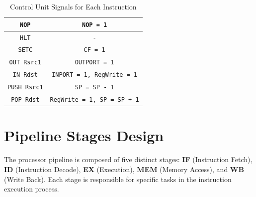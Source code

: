 \documentclass{report}
\begin{document}
\begin{table}[H]
\begin{tabular}{|c|c|}
    \texttt{NOP} & \texttt{NOP = 1} \\ \hline
    \texttt{HLT} & \texttt{-} \\ \hline
    \texttt{SETC} & \texttt{CF = 1} \\ \hline
    \texttt{OUT Rsrc1} & \texttt{OUTPORT = 1} \\ \hline
    \texttt{IN Rdst} & \texttt{INPORT = 1, RegWrite = 1} \\ \hline
    \texttt{PUSH Rsrc1} & \texttt{SP = SP - 1} \\ \hline
    \texttt{POP Rdst} & \texttt{RegWrite = 1, SP = SP + 1} \\ \hline
    \end{tabular}
    \caption{Control Unit Signals for Each Instruction}
    \label{tab:cu-signals}
\end{table}

\chapter{Pipeline Stages Design}
The processor pipeline is composed of five distinct stages: \textbf{IF} (Instruction Fetch), \textbf{ID} (Instruction Decode), \textbf{EX} (Execution), \textbf{MEM} (Memory Access), and \textbf{WB} (Write Back). Each stage is responsible for specific tasks in the instruction execution process.
\end{document}
